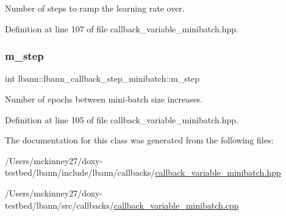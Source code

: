Number of steps to ramp the learning rate over. 



Definition at line 107 of file callback\+\_\+variable\+\_\+minibatch.\+hpp.

\mbox{\label{classlbann_1_1lbann__callback__step__minibatch_a1d150c95b193f9a24c8d7d73506b034c}} 
\subsubsection{\texorpdfstring{m\+\_\+step}{m\_step}}
{\footnotesize\ttfamily int lbann\+::lbann\+\_\+callback\+\_\+step\+\_\+minibatch\+::m\+\_\+step\hspace{0.3cm}{\ttfamily [protected]}}



Number of epochs between mini-\/batch size increases. 



Definition at line 105 of file callback\+\_\+variable\+\_\+minibatch.\+hpp.



The documentation for this class was generated from the following files\+:\begin{DoxyCompactItemize}
\item 
/\+Users/mckinney27/doxy-\/testbed/lbann/include/lbann/callbacks/\hyperlink{callback__variable__minibatch_8hpp}{callback\+\_\+variable\+\_\+minibatch.\+hpp}\item 
/\+Users/mckinney27/doxy-\/testbed/lbann/src/callbacks/\hyperlink{callback__variable__minibatch_8cpp}{callback\+\_\+variable\+\_\+minibatch.\+cpp}\end{DoxyCompactItemize}
